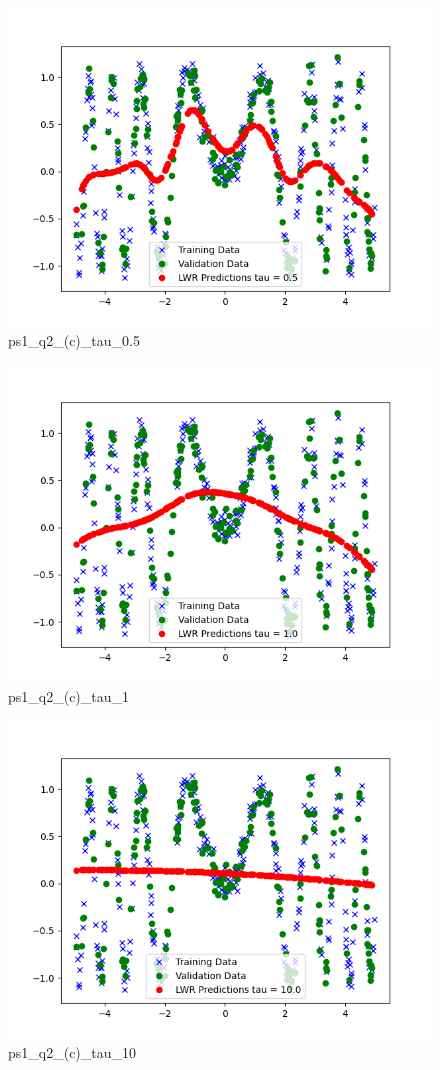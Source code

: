 \begin{answer}
\begin{figure}[H]
    \centering
    \includegraphics[width=0.5\linewidth]{ps1_q2_(c)_tau_0.5.png}
    \caption{ps1\_q2\_(c)\_tau\_0.5}
    \label{fig:enter-label}
\end{figure}

\begin{figure}[H]
    \centering
    \includegraphics[width=0.5\linewidth]{ps1_q2_(c)_tau_1.0.png}
    \caption{ps1\_q2\_(c)\_tau\_1}
    \label{fig:enter-label}
\end{figure}

\begin{figure}[H]
    \centering
    \includegraphics[width=0.5\linewidth]{ps1_q2_(c)_tau_10.0.png}
    \caption{ps1\_q2\_(c)\_tau\_10}
    \label{fig:enter-label}
\end{figure}
\end{answer}
